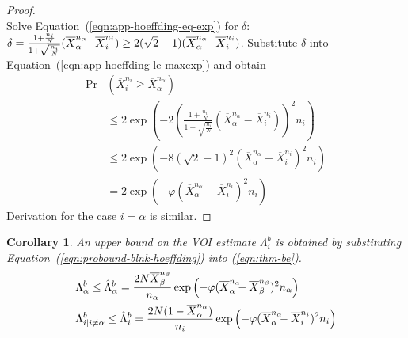 \documentclass[]{article}
\newtheorem{crl}[thm]{Corollary}
\renewcommand{\eqref}[1]{Equation~(\ref{#1})}
\begin{document}
\begin{hiddenproof}
\begin{proof}
\begin{equation}
	\end{equation}
	Solve \eqref{eqn:app-hoeffding-eq-exp} for $\delta$: $\delta=\frac {1+\frac {n_i} N} {1+\sqrt {\frac {n_i} N}} (\overline X_\alpha^{n_\alpha}\hspace{-0.5em}
	- \overline X_i^{n_i}) \ge 2(\sqrt 2 - 1)(\overline X_\alpha^{n_\alpha}\hspace{-0.5em}-\overline X_i^{n_i})$. Substitute $\delta$ into 
	\eqref{eqn:app-hoeffding-le-maxexp} and obtain
	\begin{align}
	\Pr&(\overline X_i^{n_i}\ge \overline X_\alpha^{n_\alpha}) \nonumber\\
	& \le 2\exp\left(-2\left( \frac {1+\frac {n_i} N} {1+\sqrt {\frac {n_i} N}}
	                          (\overline X_\alpha^{n_\alpha} - \overline X_i^{n_i})\right)^2 n_i\right)\nonumber \\
	& \le 2\exp(-8(\sqrt 2 - 1)^2(\overline X_\alpha^{n_\alpha} - \overline X_i^{n_i})^2n_i)\nonumber\\
	& = 2\exp(-\varphi(\overline X_\alpha^{n_\alpha} - \overline X_i^{n_i})^2n_i)
	\end{align}
	Derivation for the case $i=\alpha$ is similar.
	\end{proof}	
\end{hiddenproof}

\begin{crl}
An upper bound on the VOI estimate $\Lambda_i^b$ is obtained
by substituting \eqref{eqn:probound-blnk-hoeffding} into (\ref{eqn:thm-be}).
\begin{align}
  \label{eqn:bound-blnk-hoeffding}
  \Lambda&_\alpha^b \le \hat\Lambda_\alpha^b=\frac {2N\overline X_\beta^{n_\beta}} {n_\alpha}\exp\left(- \varphi(\overline X_\alpha^{n_\alpha}\hspace{-0.5em} - \overline X_\beta^{n_\beta})^2 n_\alpha\right)\\
  \Lambda&_{i|i\ne\alpha}^b\le \hat\Lambda_i^b=  \frac {2N(1-\overline  X_\alpha^{n_\alpha})} {n_i}\exp\left(- \varphi(\overline X_\alpha^{n_\alpha}\hspace{-0.5em} - \overline X_i^{n_i})^2 n_i\right)\nonumber
\end{align}
\label{crl:bound-blnk-hoeffding}
\end{crl}
\vspace{-2em}
\end{document}
